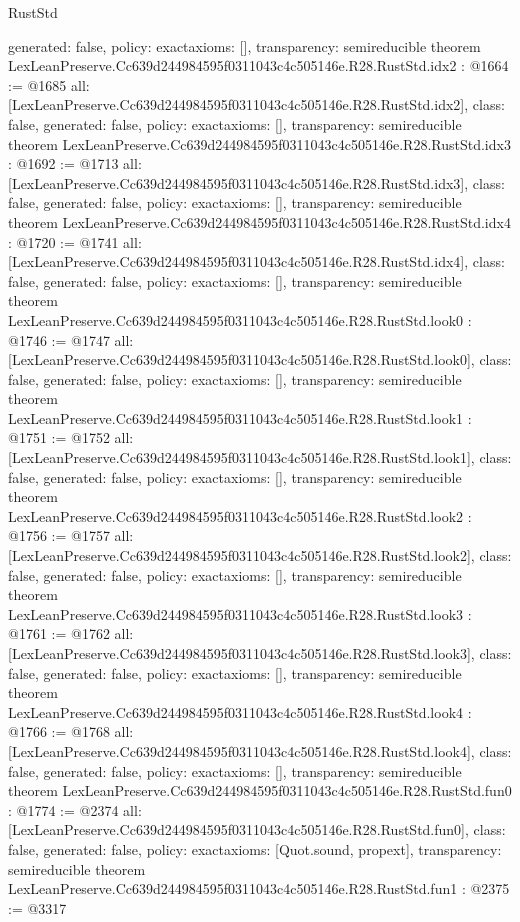 \begin{lexlean}{RustStd}
\begin{coremodule}
{  generated: false,
  policy: exact{axioms: []},
  transparency: semireducible
}
theorem LexLeanPreserve.Cc639d244984595f0311043c4c505146e.R28.RustStd.idx2 : @1664 := @1685 {
  all: [LexLeanPreserve.Cc639d244984595f0311043c4c505146e.R28.RustStd.idx2],
  class: false,
  generated: false,
  policy: exact{axioms: []},
  transparency: semireducible
}
theorem LexLeanPreserve.Cc639d244984595f0311043c4c505146e.R28.RustStd.idx3 : @1692 := @1713 {
  all: [LexLeanPreserve.Cc639d244984595f0311043c4c505146e.R28.RustStd.idx3],
  class: false,
  generated: false,
  policy: exact{axioms: []},
  transparency: semireducible
}
theorem LexLeanPreserve.Cc639d244984595f0311043c4c505146e.R28.RustStd.idx4 : @1720 := @1741 {
  all: [LexLeanPreserve.Cc639d244984595f0311043c4c505146e.R28.RustStd.idx4],
  class: false,
  generated: false,
  policy: exact{axioms: []},
  transparency: semireducible
}
theorem LexLeanPreserve.Cc639d244984595f0311043c4c505146e.R28.RustStd.look0 : @1746 := @1747 {
  all: [LexLeanPreserve.Cc639d244984595f0311043c4c505146e.R28.RustStd.look0],
  class: false,
  generated: false,
  policy: exact{axioms: []},
  transparency: semireducible
}
theorem LexLeanPreserve.Cc639d244984595f0311043c4c505146e.R28.RustStd.look1 : @1751 := @1752 {
  all: [LexLeanPreserve.Cc639d244984595f0311043c4c505146e.R28.RustStd.look1],
  class: false,
  generated: false,
  policy: exact{axioms: []},
  transparency: semireducible
}
theorem LexLeanPreserve.Cc639d244984595f0311043c4c505146e.R28.RustStd.look2 : @1756 := @1757 {
  all: [LexLeanPreserve.Cc639d244984595f0311043c4c505146e.R28.RustStd.look2],
  class: false,
  generated: false,
  policy: exact{axioms: []},
  transparency: semireducible
}
theorem LexLeanPreserve.Cc639d244984595f0311043c4c505146e.R28.RustStd.look3 : @1761 := @1762 {
  all: [LexLeanPreserve.Cc639d244984595f0311043c4c505146e.R28.RustStd.look3],
  class: false,
  generated: false,
  policy: exact{axioms: []},
  transparency: semireducible
}
theorem LexLeanPreserve.Cc639d244984595f0311043c4c505146e.R28.RustStd.look4 : @1766 := @1768 {
  all: [LexLeanPreserve.Cc639d244984595f0311043c4c505146e.R28.RustStd.look4],
  class: false,
  generated: false,
  policy: exact{axioms: []},
  transparency: semireducible
}
theorem LexLeanPreserve.Cc639d244984595f0311043c4c505146e.R28.RustStd.fun0 : @1774 := @2374 {
  all: [LexLeanPreserve.Cc639d244984595f0311043c4c505146e.R28.RustStd.fun0],
  class: false,
  generated: false,
  policy: exact{axioms: [Quot.sound, propext]},
  transparency: semireducible
}
theorem LexLeanPreserve.Cc639d244984595f0311043c4c505146e.R28.RustStd.fun1 : @2375 := @3317 {
}
\end{coremodule}
\end{lexlean}
